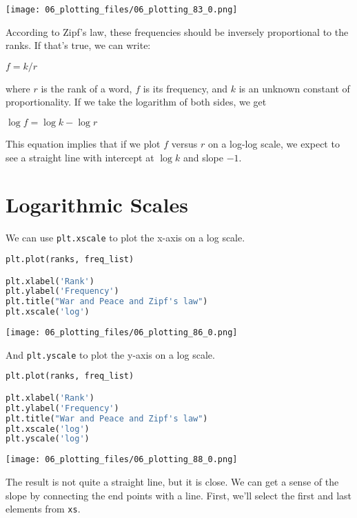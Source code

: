 \begin{center}
\texttt{[image: 06\_plotting\_files/06\_plotting\_83\_0.png]}
\end{center}

According to Zipf's law, these frequencies should be inversely
proportional to the ranks. If that's true, we can write:

\(f = k / r\)

where \(r\) is the rank of a word, \(f\) is its frequency, and \(k\) is
an unknown constant of proportionality. If we take the logarithm of both
sides, we get

\(\log f = \log k - \log r\)

This equation implies that if we plot \(f\) versus \(r\) on a log-log
scale, we expect to see a straight line with intercept at \(\log k\) and
slope \(-1\).

\section{Logarithmic Scales}\label{logarithmic-scales}

We can use \passthrough{\lstinline!plt.xscale!} to plot the x-axis on a
log scale.

\begin{lstlisting}[language=Python,style=source]
plt.plot(ranks, freq_list)

plt.xlabel('Rank')
plt.ylabel('Frequency')
plt.title("War and Peace and Zipf's law")
plt.xscale('log')
\end{lstlisting}

\begin{center}
\texttt{[image: 06\_plotting\_files/06\_plotting\_86\_0.png]}
\end{center}

And \passthrough{\lstinline!plt.yscale!} to plot the y-axis on a log
scale.

\begin{lstlisting}[language=Python,style=source]
plt.plot(ranks, freq_list)

plt.xlabel('Rank')
plt.ylabel('Frequency')
plt.title("War and Peace and Zipf's law")
plt.xscale('log')
plt.yscale('log')
\end{lstlisting}

\begin{center}
\texttt{[image: 06\_plotting\_files/06\_plotting\_88\_0.png]}
\end{center}

The result is not quite a straight line, but it is close. We can get a
sense of the slope by connecting the end points with a line. First,
we'll select the first and last elements from
\passthrough{\lstinline!xs!}.

